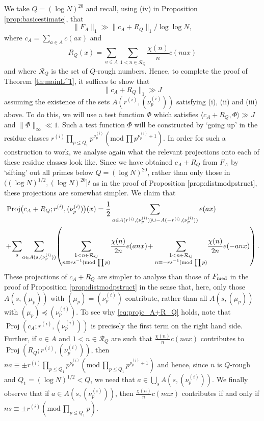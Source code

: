 \documentclass[11pt, reqno]{amsart}
\newcommand{\md}[1]{\ensuremath{(\mbox{mod}\, #1)}}
\newcommand{\mdsub}[1]{\ensuremath{(\mbox{\scriptsize mod}\, #1)}}
\DeclareMathOperator{\Proj}{Proj}
\begin{document}
We take $Q=(\log N)^{20}$ and recall, using (iv) in Proposition \ref{prop:basicestimate}, that
$$\lVert F_A\rVert_1\gg \lVert c_A+R_Q\rVert_1/\log \log N,$$
where $c_A=\sum_{a\in A}c( ax)$ and $$R_Q(x)=\sum_{a\in A}\sum_{1<n\in \mathcal{R}_Q}\frac{\chi(n)}{n}c( nax)$$ and where $\mathcal{R}_Q$ is the set of $Q$-rough numbers. Hence, to complete the proof of Theorem \ref{th:mainL^1}, it suffices to show that 
\begin{equation}\label{eq:goodL^1}
\lVert c_A+R_Q\rVert_1 \gg  J
\end{equation}
assuming the existence of the sets $A(r^{(i)},(\nu_p^{(i)}))$ satisfying (i), (ii) and (iii) above.
To do this, we will use a test function $\Phi$ which satisfies $\langle c_A+R_Q,\Phi\rangle \gg J$ and $\lVert \Phi\rVert_\infty\ll 1$. Such a test function $\Phi$ will be constructed by `going up' in the residue classes $r^{(i)}\prod_{p\leqslant Q_1}p^{\nu_p^{(i)}}\md{\prod p^{\nu_p^{(i)}+1}}$. In order for such a construction to work, we analyse again what the relevant projections onto each of these residue classes look like. Since we have obtained $c_A+R_Q$ from $F_A$ by `sifting' out all primes below $Q=(\log N)^{20}$, rather than only those in $((\log N)^{1/2},(\log N)^{20}]t$ as in the proof of Proposition \ref{prop:distmodpstruct}, these projections are somewhat simpler. We claim that
\begin{align}\label{eq:projc_A+R_Q}
    &\Proj\bigl(c_A+R_Q;r^{(i)},(\nu_p^{(i)})\bigr)(x)=\frac{1}{2}\sum_{a\in A(r^{(i)},(\nu_p^{(i)}))\cup-A(-r^{(i)},(\nu_p^{(i)}))}e(ax)\\ &\!+\!\sum_s\!\sum_{a\in A(s,(\nu_p^{(i)}))}\!\left(\sum_{\substack{1<n\in\mathcal{R}_Q\\n\equiv rs^{-1}\mdsub{\prod p}}}\!\frac{\chi(n)}{2n}e(anx)\!+\sum_{\substack{1<n\in\mathcal{R}_Q\\n\equiv -rs^{-1}\mdsub{\prod p}}}\!\frac{\chi(n)}{2n}e(-anx)\right).\nonumber
\end{align}
These projections of $c_A+R_Q$ are simpler to analyse than those of $F_\textnormal{med}$ in the proof of Proposition \ref{prop:distmodpstruct} in the sense that, here, only those $A(s,(\mu_p))$ with $(\mu_p)=(\nu_p^{(i)})$ contribute, rather than all $A(s,(\mu_p))$ with $(\mu_p)\preceq(\nu_p^{(i)})$. To see why \eqref{eq:projc_A+R_Q} holds, note that $\Proj(c_A;r^{(i)},(\nu_p^{(i)}))$ is precisely the first term on the right hand side. Further, if $a\in A$ and $1<n\in\mathcal{R}_Q$ are such that $\frac{\chi(n)}{n}c( nax)$ contributes to $\Proj(R_Q;r^{(i)},(\nu_p^{(i)}))$, then $na\equiv \pm r^{(i)}\prod_{p\leqslant Q_1}p^{\nu_p^{(i)}}\md{\prod_{p\leqslant Q_1}p^{\nu_p^{(i)}+1}}$ and hence, since $n$ is $Q$-rough and $Q_1=(\log N)^{1/2}<Q$, we need that $a\in \bigcup_s A(s,(\nu_p^{(i)}))$. We finally observe that if $a\in A(s,(\nu_p^{(i)}))$, then $\frac{\chi(n)}{n}c( nax)$ contributes if and only if $ns\equiv \pm r^{(i)}\md{\prod_{p\leqslant Q_1}p}$. 
\end{document}
